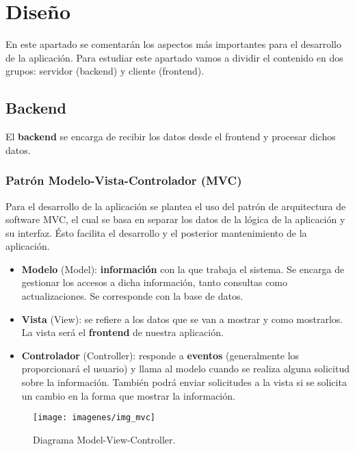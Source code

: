 \chapter{Diseño}

En este apartado se comentarán los aspectos más importantes para el desarrollo de la aplicación. Para estudiar este apartado vamos a dividir el contenido en dos grupos: servidor (backend) y cliente (frontend).

\section{Backend}
El \textbf{backend} se encarga de recibir los datos desde el frontend y procesar dichos datos. \\

\subsection{Patrón Modelo-Vista-Controlador (MVC)}
Para el desarrollo de la aplicación se plantea el uso del patrón de arquitectura de software MVC, el cual se basa en separar los datos de la lógica de la aplicación y su interfaz. Ésto facilita el desarrollo y el posterior mantenimiento de la aplicación.
\begin{itemize}
	\item \textbf{Modelo} (Model): \textbf{información} con la que trabaja el sistema. Se encarga de gestionar los accesos a dicha información, tanto consultas como actualizaciones. Se corresponde con la base de datos.
	\item \textbf{Vista} (View): se refiere a los datos que se van a mostrar y como mostrarlos. La vista será el \textbf{frontend} de nuestra aplicación.
	\item \textbf{Controlador} (Controller): responde a \textbf{eventos} (generalmente los proporcionará el usuario) y llama al modelo cuando se realiza alguna solicitud sobre la información. También podrá enviar solicitudes a la vista si se solicita un cambio en la forma que mostrar la información. \\
\end{itemize}

\begin{figure}[H]
	\centering
	\texttt{[image: imagenes/img\_mvc]}
	\caption{Diagrama Model-View-Controller.}
	\label{fig:img_mvc}
\end{figure}

